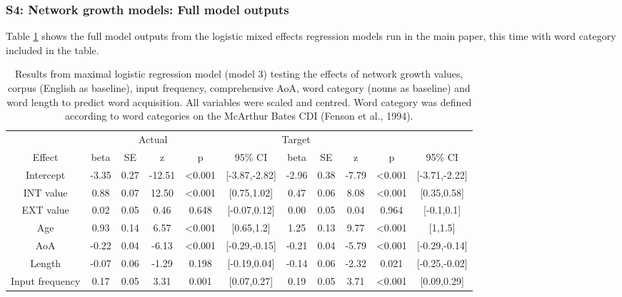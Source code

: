 \documentclass[
  man,floatsintext]{apa6}
\begin{document}
\newpage

\hypertarget{s4-network-growth-models-full-model-outputs}{%
\subsubsection{S4: Network growth models: Full model outputs}\label{s4-network-growth-models-full-model-outputs}}

Table \ref{tab:full-data-summary} shows the full model outputs from the logistic mixed effects regression models run in the main paper, this time with word category included in the table.

\begingroup\fontsize{7}{9}\selectfont

\begin{longtable}[t]{ccccccccccc}
\caption{\label{tab:full-data-summary}Results from maximal logistic regression model (model 3) testing the effects of network growth values, corpus (English as baseline), input frequency, comprehensive AoA, word category (nouns as baseline) and word length to predict word acquisition. All variables were scaled and centred. Word category was defined according to word categories on the McArthur Bates CDI (Fenson et al., 1994).}\\
\toprule
\multicolumn{1}{c}{ } & \multicolumn{4}{c}{Actual} & \multicolumn{4}{c}{Target} \\
\cmidrule(l{3pt}r{3pt}){2-5} \cmidrule(l{3pt}r{3pt}){6-9}
Effect & beta & SE & z & p & 95\% CI & beta & SE & z & p & 95\% CI\\
\midrule
Intercept & -3.35 & 0.27 & -12.51 & <0.001 & {}[-3.87,-2.82] & -2.96 & 0.38 & -7.79 & <0.001 & {}[-3.71,-2.22]\\
INT value & 0.88 & 0.07 & 12.50 & <0.001 & {}[0.75,1.02] & 0.47 & 0.06 & 8.08 & <0.001 & {}[0.35,0.58]\\
EXT value & 0.02 & 0.05 & 0.46 & 0.648 & {}[-0.07,0.12] & 0.00 & 0.05 & 0.04 & 0.964 & {}[-0.1,0.1]\\
Age & 0.93 & 0.14 & 6.57 & <0.001 & {}[0.65,1.2] & 1.25 & 0.13 & 9.77 & <0.001 & {}[1,1.5]\\
AoA & -0.22 & 0.04 & -6.13 & <0.001 & {}[-0.29,-0.15] & -0.21 & 0.04 & -5.79 & <0.001 & {}[-0.29,-0.14]\\
\addlinespace
Length & -0.07 & 0.06 & -1.29 & 0.198 & {}[-0.19,0.04] & -0.14 & 0.06 & -2.32 & 0.021 & {}[-0.25,-0.02]\\
Input frequency & 0.17 & 0.05 & 3.31 & 0.001 & {}[0.07,0.27] & 0.19 & 0.05 & 3.71 & <0.001 & {}[0.09,0.29]\\

\end{longtable}
\end{document}

